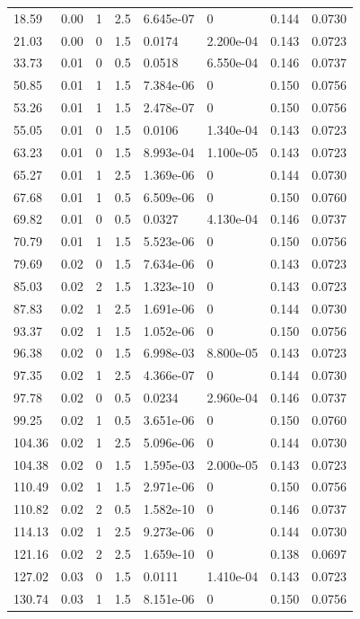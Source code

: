 \documentclass[preview]{standalone}
\begin{document}
{{\begin{tabular}{L{1.2cm}C{1.2cm} C{0.3cm}C{0.5cm} C{1.4cm}C{1.4cm} C{1.4cm}C{1.4cm}}
  18.59  &  0.00  & 1     & 2.5 &  6.645e-07  & 0  & 0.144 &  0.0730   \\ 
  21.03  &  0.00  & 0     & 1.5 &  0.0174  & 2.200e-04  & 0.143 &  0.0723   \\ 
  33.73  &  0.01  & 0     & 0.5 &  0.0518  & 6.550e-04  & 0.146 &  0.0737   \\ 
  50.85  &  0.01  & 1     & 1.5 &  7.384e-06  & 0  & 0.150 &  0.0756   \\ 
  53.26  &  0.01  & 1     & 1.5 &  2.478e-07  & 0  & 0.150 &  0.0756   \\ 
  55.05  &  0.01  & 0     & 1.5 &  0.0106  & 1.340e-04  & 0.143 &  0.0723   \\ 
  63.23  &  0.01  & 0     & 1.5 &  8.993e-04  & 1.100e-05  & 0.143 &  0.0723   \\ 
  65.27  &  0.01  & 1     & 2.5 &  1.369e-06  & 0  & 0.144 &  0.0730   \\ 
  67.68  &  0.01  & 1     & 0.5 &  6.509e-06  & 0  & 0.150 &  0.0760   \\ 
  69.82  &  0.01  & 0     & 0.5 &  0.0327  & 4.130e-04  & 0.146 &  0.0737   \\ 
  70.79  &  0.01  & 1     & 1.5 &  5.523e-06  & 0  & 0.150 &  0.0756   \\ 
  79.69  &  0.02  & 0     & 1.5 &  7.634e-06  & 0  & 0.143 &  0.0723   \\ 
  85.03  &  0.02  & 2     & 1.5 &  1.323e-10  & 0  & 0.143 &  0.0723   \\ 
  87.83  &  0.02  & 1     & 2.5 &  1.691e-06  & 0  & 0.144 &  0.0730   \\ 
  93.37  &  0.02  & 1     & 1.5 &  1.052e-06  & 0  & 0.150 &  0.0756   \\ 
  96.38  &  0.02  & 0     & 1.5 &  6.998e-03  & 8.800e-05  & 0.143 &  0.0723   \\ 
  97.35  &  0.02  & 1     & 2.5 &  4.366e-07  & 0  & 0.144 &  0.0730   \\ 
  97.78  &  0.02  & 0     & 0.5 &  0.0234  & 2.960e-04  & 0.146 &  0.0737   \\ 
  99.25  &  0.02  & 1     & 0.5 &  3.651e-06  & 0  & 0.150 &  0.0760   \\ 
  104.36  &  0.02  & 1     & 2.5 &  5.096e-06  & 0  & 0.144 &  0.0730   \\ 
  104.38  &  0.02  & 0     & 1.5 &  1.595e-03  & 2.000e-05  & 0.143 &  0.0723   \\ 
  110.49  &  0.02  & 1     & 1.5 &  2.971e-06  & 0  & 0.150 &  0.0756   \\ 
  110.82  &  0.02  & 2     & 0.5 &  1.582e-10  & 0  & 0.146 &  0.0737   \\ 
  114.13  &  0.02  & 1     & 2.5 &  9.273e-06  & 0  & 0.144 &  0.0730   \\ 
  121.16  &  0.02  & 2     & 2.5 &  1.659e-10  & 0  & 0.138 &  0.0697   \\ 
  127.02  &  0.03  & 0     & 1.5 &  0.0111  & 1.410e-04  & 0.143 &  0.0723   \\ 
  130.74  &  0.03  & 1     & 1.5 &  8.151e-06  & 0  & 0.150 &  0.0756   \\ 
\hline 
\end{tabular} 

}}
\end{document}
